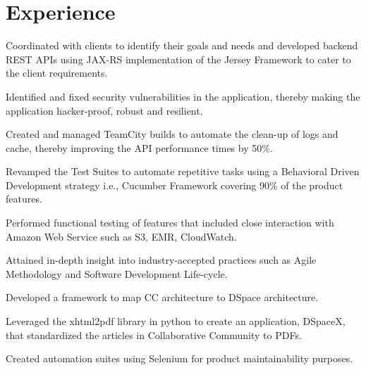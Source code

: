 \documentclass[]{deedy-resume-openfont}
\begin{document}
\begin{minipage}[t]{0.66\textwidth} 



\section{Experience}

\descript{}
\sectionsep
\runsubsection{}
\begin{bullets}
\item Coordinated with clients to identify their goals and needs and developed backend REST APIs using JAX-RS implementation of the Jersey Framework to cater to the client requirements.
\item Identified and fixed security vulnerabilities in the application, thereby making the application hacker-proof, robust and resilient.
\item Created and managed TeamCity builds to automate the clean-up of logs and cache, thereby improving the API performance times by 50\%.
\end{bullets}
\vspace{\topsep} %

\begin{bullets}
\item Revamped the Test Suites to automate repetitive tasks using a Behavioral Driven Development strategy i.e., Cucumber Framework covering 90\% of the product features.
\item Performed functional testing of features that included close interaction with Amazon Web Service such as S3, EMR, CloudWatch.
\item Attained in-depth insight into industry-accepted practices such as Agile Methodology and Software Development Life-cycle.
\end{bullets}
\vspace{\topsep} %
\sectionsep


\descript{}
\sectionsep
\runsubsection{}

\begin{bullets}
\item Developed a framework to map CC architecture to DSpace architecture.
\item Leveraged the xhtml2pdf library in python to create an application, DSpaceX, that standardized the articles in Collaborative Community to PDFs.
\item Created automation suites using Selenium for product maintainability purposes.
\end{bullets}
\sectionsep


\end{minipage}
\end{document}
